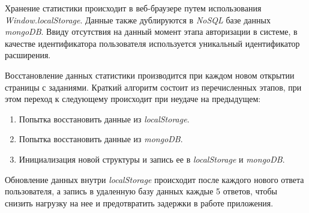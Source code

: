 Хранение статистики происходит в веб-браузере путем использования \emph{Window.localStorage}. Данные также дублируются в \emph{NoSQL} базе данных \emph{mongoDB}. Ввиду отсутствия на данный момент этапа авторизации в системе, в качестве идентификатора пользователя используется уникальный идентификатор расширения.

Восстановление данных статистики производится при каждом новом открытии страницы с заданиями. Краткий алгоритм состоит из перечисленных этапов, при этом переход к следующему происходит при неудаче на предыдущем:
\begin{enumerate}
  \item Попытка восстановить данные из \emph{localStorage}.
  \item Попытка восстановить данные из \emph{mongoDB}.
  \item Инициализация новой структуры и запись ее в \emph{localStorage} и \emph{mongoDB}.
\end{enumerate}

Обновление данных внутри \emph{localStorage} происходит после каждого нового ответа пользователя, а запись в удаленную базу данных каждые 5 ответов, чтобы снизить нагрузку на нее и предотвратить задержки в работе приложения.
\newpage

\printbibliography[%
    heading=bibintoc%
]








%
%
%
%

